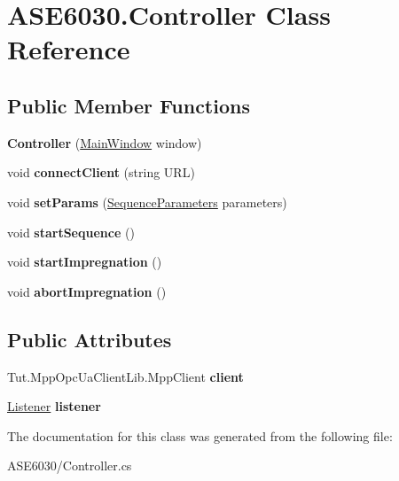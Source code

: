 \hypertarget{class_a_s_e6030_1_1_controller}{}\section{A\+S\+E6030.\+Controller Class Reference}
\label{class_a_s_e6030_1_1_controller}
\subsection*{Public Member Functions}
\begin{DoxyCompactItemize}
\item 
\mbox{\label{class_a_s_e6030_1_1_controller_aa7df468c34d983c6efe88f12abeffb79}} 
{\bfseries Controller} (\hyperlink{class_a_s_e6030_1_1_main_window}{Main\+Window} window)
\item 
\mbox{\label{class_a_s_e6030_1_1_controller_a5f84e69b4885c561df4bc177fcc54d40}} 
void {\bfseries connect\+Client} (string U\+RL)
\item 
\mbox{\label{class_a_s_e6030_1_1_controller_afee09ba01da47aa772ce3da642e08e47}} 
void {\bfseries set\+Params} (\hyperlink{class_a_s_e6030_1_1_sequence_parameters}{Sequence\+Parameters} parameters)
\item 
\mbox{\label{class_a_s_e6030_1_1_controller_afca76c3628ed37f21c1aac044a5e0441}} 
void {\bfseries start\+Sequence} ()
\item 
\mbox{\label{class_a_s_e6030_1_1_controller_aaad2a679e6a2f5db4193f58fd7482def}} 
void {\bfseries start\+Impregnation} ()
\item 
\mbox{\label{class_a_s_e6030_1_1_controller_ab508adee38f1120e4213efd9104480cf}} 
void {\bfseries abort\+Impregnation} ()
\end{DoxyCompactItemize}
\subsection*{Public Attributes}
\begin{DoxyCompactItemize}
\item 
\mbox{\label{class_a_s_e6030_1_1_controller_a36785106c3f4bc54402290b0d86911fc}} 
Tut.\+Mpp\+Opc\+Ua\+Client\+Lib.\+Mpp\+Client {\bfseries client}
\item 
\mbox{\label{class_a_s_e6030_1_1_controller_a8cc31711b16a81099afb9ad6125d1d0f}} 
\hyperlink{class_a_s_e6030_1_1_listener}{Listener} {\bfseries listener}
\end{DoxyCompactItemize}


The documentation for this class was generated from the following file\+:\begin{DoxyCompactItemize}
\item 
A\+S\+E6030/Controller.\+cs\end{DoxyCompactItemize}
